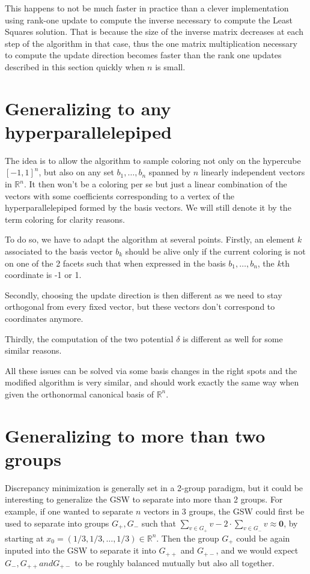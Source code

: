 \documentclass[12pt]{article}
\begin{document}
This happens to not be much faster in practice than a clever implementation using rank-one update to compute the inverse necessary to compute the Least Squares solution. That is because the size of the inverse matrix decreases at each step of the algorithm in that case, thus the one matrix multiplication necessary to compute the update direction becomes faster than the rank one updates described in this section quickly when $n$ is small.


\section{Generalizing to any hyperparallelepiped}
The idea is to allow the algorithm to sample coloring not only on the hypercube $[-1,1]^n$, but also on any set $b_1,\dots, b_n$ spanned by $n$ linearly independent vectors in $\mathbb{R}^n$. It then won't be a coloring per se but just a linear combination of the vectors with some coefficients corresponding to a vertex of the hyperparallelepiped formed by the basis vectors. We will still denote it by the term coloring for clarity reasons.

To do so, we have to adapt the algorithm at several points. Firstly, an element $k$ associated to the basis vector $b_k$ should be alive only if the current coloring is not on one of the 2 facets such that when expressed in the basis $b_1,\dots,b_n$, the $k$th coordinate is -1 or 1. 

Secondly, choosing the update direction is then different as we need to stay orthogonal from every fixed vector, but these vectors don't correspond to coordinates anymore.

Thirdly, the computation of the two potential $\delta$ is different as well for some similar reasons.

All these issues can be solved via some basis changes in the right spots and the modified algorithm is very similar, and should work exactly the same way when given the orthonormal canonical basis of $\mathbb{R}^n$.

\section{Generalizing to more than two groups}
Discrepancy minimization is generally set in a 2-group paradigm, but it could be interesting to generalize the GSW to separate into more than 2 groups. For example, if one wanted to separate $n$ vectors in 3 groups, the GSW could first be used to separate into groups $G_+,G_-$ such that $\sum_{v\in G_+}v-2\cdot\sum_{v\in G_-}v\approx \textbf{0}$, by starting at $x_0=(1/3,1/3,\dots,1/3)\in\mathbb{R}^n$. Then the group $G_+$ could be again inputed into the GSW to separate it into $G_{++}$ and $G_{+-}$, and we would expect $G_-,G_{++} and G_{+-}$ to be roughly balanced mutually but also all together.
\end{document}
